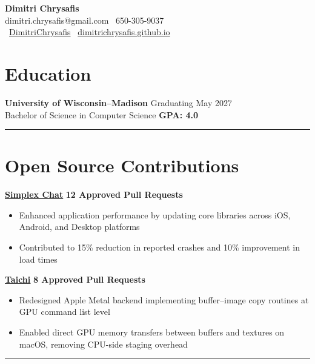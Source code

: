 \documentclass[11pt]{article}
\begin{document}
\begin{center}
\textbf{\Large Dimitri Chrysafis}\\[2pt]
dimitri.chrysafis@gmail.com \textbullet \ 650-305-9037\\
\faGithub \ \href{https://github.com/DimitriChrysafis}{DimitriChrysafis} \textbullet \ \href{https://dimitrichrysafis.github.io/}{dimitrichrysafis.github.io}
\end{center}

\vspace{4pt}

\section*{\textcolor{modernblue}{\Large Education}}
\textbf{University of Wisconsin–Madison} \hfill Graduating May 2027\\
Bachelor of Science in Computer Science \hfill \textcolor{accentgreen}{\textbf{GPA: 4.0}}

\noindent\rule{\textwidth}{0.5pt}

\section*{\textcolor{modernblue}{\Large Open Source Contributions}}
\textbf{\href{https://simplex.chat/}{\underline{Simplex Chat}}} \hfill \textcolor{modernblue}{\textbf{12 Approved Pull Requests}}
\begin{itemize}[leftmargin=*, topsep=0pt, itemsep=0pt, parsep=0pt]
\item Enhanced application performance by updating core libraries across iOS, Android, and Desktop platforms
\item Contributed to 15\% reduction in reported crashes and 10\% improvement in load times
\end{itemize}
\vspace{1pt}
\noindent\textbf{\href{https://www.taichi-lang.org/}{\underline{Taichi}}} \hfill \textcolor{modernblue}{\textbf{8 Approved Pull Requests}}
\begin{itemize}[leftmargin=*, topsep=0pt, itemsep=0pt, parsep=0pt]
\item Redesigned Apple Metal backend implementing buffer–image copy routines at GPU command list level
\item Enabled direct GPU memory transfers between buffers and textures on macOS, removing CPU-side staging overhead
\end{itemize}

\noindent\rule{\textwidth}{0.5pt}
\end{document}
